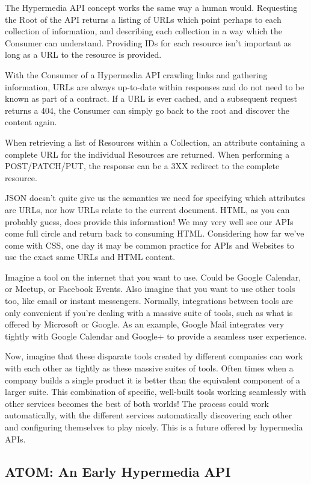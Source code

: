 \documentclass{book}
\begin{document}
The Hypermedia API concept works the same way a human would. Requesting the Root of the API returns a listing of URLs which point perhaps to each collection of information, and describing each collection in a way which the Consumer can understand. Providing IDs for each resource isn't important as long as a URL to the resource is provided.

With the Consumer of a Hypermedia API crawling links and gathering information, URLs are always up-to-date within responses and do not need to be known as part of a contract. If a URL is ever cached, and a subsequent request returns a 404, the Consumer can simply go back to the root and discover the content again.

When retrieving a list of Resources within a Collection, an attribute containing a complete URL for the individual Resources are returned. When performing a POST/PATCH/PUT, the response can be a 3XX redirect to the complete resource.

JSON doesn't quite give us the semantics we need for specifying which attributes are URLs, nor how URLs relate to the current document. HTML, as you can probably guess, does provide this information! We may very well see our APIs come full circle and return back to consuming HTML. Considering how far we've come with CSS, one day it may be common practice for APIs and Websites to use the exact same URLs and HTML content.

Imagine a tool on the internet that you want to use. Could be Google Calendar, or Meetup, or Facebook Events. Also imagine that you want to use other tools too, like email or instant messengers. Normally, integrations between tools are only convenient if you're dealing with a massive suite of tools, such as what is offered by Microsoft or Google. As an example, Google Mail integrates very tightly with Google Calendar and Google+ to provide a seamless user experience.

Now, imagine that these disparate tools created by different companies can work with each other as tightly as these massive suites of tools. Often times when a company builds a single product it is better than the equivalent component of a larger suite. This combination of specific, well-built tools working seamlessly with other services becomes the best of both worlds! The process could work automatically, with the different services automatically discovering each other and configuring themselves to play nicely. This is a future offered by hypermedia APIs.

\subsection{ATOM: An Early Hypermedia API}
\end{document}
